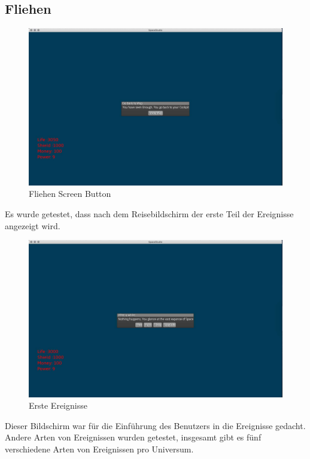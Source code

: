 \documentclass[12pt]{article}
\begin{document}
\subsection{Fliehen}
\begin{figure}[htp]
\centering
\includegraphics[scale=0.4]{TestProtocolBilder/flee.jpg}
\caption{Fliehen Screen Button}
\end{figure}
\newpage
Es wurde getestet, dass nach dem Reisebildschirm der erste Teil der Ereignisse angezeigt wird.\\
\begin{figure}[htp]
\centering
\includegraphics[scale=0.4]{TestProtocolBilder/InitialGeeinisse.jpg}
\caption{Erste Ereignisse}
\end{figure}
Dieser Bildschirm war für die Einführung des Benutzers in die Ereignisse gedacht.
\newpage
Andere Arten von Ereignissen wurden getestet, insgesamt gibt es fünf verschiedene Arten von Ereignissen pro Universum.
\end{document}
